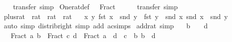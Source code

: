 \begin{isabellebody}
%
\isadelimproof
\ \ %
\endisadelimproof
%
\isatagproof
{}\isamarkupfalse%
\ transfer\ simp%
\endisatagproof
{\isafoldproof}%
%
\isadelimproof
\isanewline
%
\endisadelimproof
\isanewline
{}\isamarkupfalse%
\ One{\isacharunderscore}{\kern0pt}rat{\isacharunderscore}{\kern0pt}def{\isacharcolon}{\kern0pt}\ {\isachardoublequoteopen}{}\ {\isacharequal}{\kern0pt}\ Fract\ {}\ {}{\isachardoublequoteclose}\isanewline
%
\isadelimproof
\ \ %
\endisadelimproof
%
\isatagproof
{}\isamarkupfalse%
\ transfer\ simp%
\endisatagproof
{\isafoldproof}%
%
\isadelimproof
\isanewline
%
\endisadelimproof
\isanewline
{}\isamarkupfalse%
\ plus{\isacharunderscore}{\kern0pt}rat\ {\isacharcolon}{\kern0pt}{\isacharcolon}{\kern0pt}\ {\isachardoublequoteopen}rat\ {\isasymRightarrow}\ rat\ {\isasymRightarrow}\ rat{\isachardoublequoteclose}\isanewline
\ \ \ {\isachardoublequoteopen}{\isasymlambda}x\ y{\isachardot}{\kern0pt}\ {\isacharparenleft}{\kern0pt}fst\ x\ {\isacharasterisk}{\kern0pt}\ snd\ y\ {\isacharplus}{\kern0pt}\ fst\ y\ {\isacharasterisk}{\kern0pt}\ snd\ x{\isacharcomma}{\kern0pt}\ snd\ x\ {\isacharasterisk}{\kern0pt}\ snd\ y{\isacharparenright}{\kern0pt}{\isachardoublequoteclose}\isanewline
%
\isadelimproof
\ \ %
\endisadelimproof
%
\isatagproof
{}\isamarkupfalse%
\ {\isacharparenleft}{\kern0pt}auto\ simp{\isacharcolon}{\kern0pt}\ distrib{\isacharunderscore}{\kern0pt}right{\isacharparenright}{\kern0pt}\ {\isacharparenleft}{\kern0pt}simp\ add{\isacharcolon}{\kern0pt}\ ac{\isacharunderscore}{\kern0pt}simps{\isacharparenright}{\kern0pt}%
\endisatagproof
{\isafoldproof}%
%
\isadelimproof
\isanewline
%
\endisadelimproof
\isanewline
{}\isamarkupfalse%
\ add{\isacharunderscore}{\kern0pt}rat\ {\isacharbrackleft}{\kern0pt}simp{\isacharbrackright}{\kern0pt}{\isacharcolon}{\kern0pt}\isanewline
\ \ \ {\isachardoublequoteopen}b\ {\isasymnoteq}\ {}{\isachardoublequoteclose}\ \ {\isachardoublequoteopen}d\ {\isasymnoteq}\ {}{\isachardoublequoteclose}\isanewline
\ \ \ {\isachardoublequoteopen}Fract\ a\ b\ {\isacharplus}{\kern0pt}\ Fract\ c\ d\ {\isacharequal}{\kern0pt}\ Fract\ {\isacharparenleft}{\kern0pt}a\ {\isacharasterisk}{\kern0pt}\ d\ {\isacharplus}{\kern0pt}\ c\ {\isacharasterisk}{\kern0pt}\ b{\isacharparenright}{\kern0pt}\ {\isacharparenleft}{\kern0pt}b\ {\isacharasterisk}{\kern0pt}\ d{\isacharparenright}{\kern0pt}{\isachardoublequoteclose}\isanewline

\end{isabellebody}

